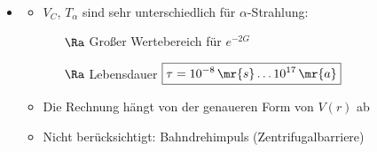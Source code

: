 \begin{itemize}
\begin{align}
\end{align}
\item {}
\begin{itemize}
\item $V_C$, $T_\alpha$ sind sehr unterschiedlich für $\alpha$-Strahlung:
\begin{itemize}
\item[$\Ra$] Großer Wertebereich für $e^{-2G}$
\item[$\Ra$] Lebensdauer $\boxed{\tau = 10^{-8}\,\mr{s} \dots 10^{17}\,\mr{a}}$
\end{itemize}
\item Die Rechnung hängt von der genaueren Form von $V(r)$ ab
\item Nicht berücksichtigt: Bahndrehimpuls (Zentrifugalbarriere)
\end{itemize}
\end{itemize}

